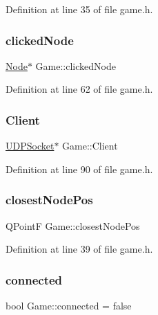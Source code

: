 Definition at line 35 of file game.\+h.

\mbox{\label{class_game_a12f4bf2a7c8503c39b3102c4cc9dd40a}} 
\subsubsection{\texorpdfstring{clicked\+Node}{clickedNode}}
{\footnotesize\ttfamily \hyperlink{class_node}{Node}$\ast$ Game\+::clicked\+Node}



Definition at line 62 of file game.\+h.

\mbox{\label{class_game_aa7fd8508fad68c550129f2be61c37467}} 
\subsubsection{\texorpdfstring{Client}{Client}}
{\footnotesize\ttfamily \hyperlink{class_u_d_p_socket}{U\+D\+P\+Socket}$\ast$ Game\+::\+Client}



Definition at line 90 of file game.\+h.

\mbox{\label{class_game_a861bf240380d110b285659d8af3f0406}} 
\subsubsection{\texorpdfstring{closest\+Node\+Pos}{closestNodePos}}
{\footnotesize\ttfamily Q\+PointF Game\+::closest\+Node\+Pos}



Definition at line 39 of file game.\+h.

\mbox{\label{class_game_aec6408b42da34f430bffb649653de96b}} 
\subsubsection{\texorpdfstring{connected}{connected}}
{\footnotesize\ttfamily bool Game\+::connected = false}



